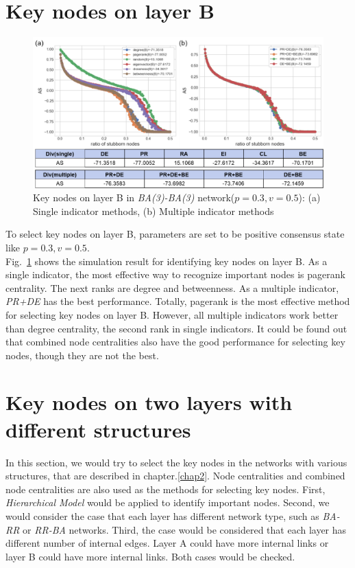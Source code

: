 \section{Key nodes on layer B}
\begin{figure}[!htb]
	\centering
	\includegraphics[width=\hsize]{figure/chap5_keynode_B.png}
	\caption{Key nodes on layer B in \textit{BA(3)-BA(3)} network($p=0.3, v=0.5$): (a) Single indicator methods, (b) Multiple indicator methods}
	\label{chap5_keynode_B}
\end{figure}

To select key nodes on layer B, parameters are set to be positive consensus state like $p=0.3, v=0.5$.\\
Fig.~\ref{chap5_keynode_B} shows the simulation result for identifying key nodes on layer B. As a single indicator, the most effective way to recognize important nodes is pagerank centrality. The next ranks are degree and betweenness. As a multiple indicator, \textit{PR+DE} has the best performance. Totally, pagerank is the most effective method for selecting key nodes on layer B. However, all multiple indicators work better than degree centrality, the second rank in single indicators. It could be found out that combined node centralities also have the good performance for selecting key nodes, though they are not the best. \\

\section{Key nodes on two layers with different structures}
In this section, we would try to select the key nodes in the networks with various structures, that are described in chapter.\ref{chap2}. Node centralities and combined node centralities are also used as the methods for selecting key nodes. First, \textit{Hierarchical Model} would be applied to identify important nodes. Second, we would consider the case that each layer has different network type, such as \textit{BA-RR} or \textit{RR-BA} networks. Third, the case would be considered that each layer has different number of internal edges. Layer A could have more internal links or layer B could have more internal links. Both cases would be checked. \\

